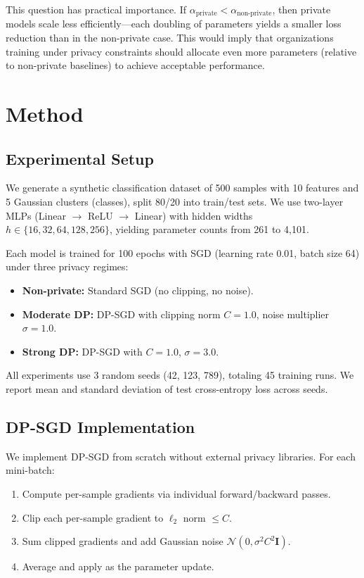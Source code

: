 \documentclass[11pt,a4paper]{article}
\begin{document}
This question has practical importance. If $\alpha_{\text{private}} < \alpha_{\text{non-private}}$, then private models scale less efficiently---each doubling of parameters yields a smaller loss reduction than in the non-private case. This would imply that organizations training under privacy constraints should allocate even more parameters (relative to non-private baselines) to achieve acceptable performance.

\section{Method}

\subsection{Experimental Setup}

We generate a synthetic classification dataset of 500 samples with 10 features and 5 Gaussian clusters (classes), split 80/20 into train/test sets. We use two-layer MLPs (Linear $\to$ ReLU $\to$ Linear) with hidden widths $h \in \{16, 32, 64, 128, 256\}$, yielding parameter counts from 261 to 4,101.

Each model is trained for 100 epochs with SGD (learning rate 0.01, batch size 64) under three privacy regimes:
\begin{itemize}
  \item \textbf{Non-private:} Standard SGD (no clipping, no noise).
  \item \textbf{Moderate DP:} DP-SGD with clipping norm $C = 1.0$, noise multiplier $\sigma = 1.0$.
  \item \textbf{Strong DP:} DP-SGD with $C = 1.0$, $\sigma = 3.0$.
\end{itemize}

All experiments use 3 random seeds (42, 123, 789), totaling 45 training runs. We report mean and standard deviation of test cross-entropy loss across seeds.

\subsection{DP-SGD Implementation}

We implement DP-SGD from scratch without external privacy libraries. For each mini-batch:
\begin{enumerate}
  \item Compute per-sample gradients via individual forward/backward passes.
  \item Clip each per-sample gradient to $\ell_2$ norm $\leq C$.
  \item Sum clipped gradients and add Gaussian noise $\mathcal{N}(0, \sigma^2 C^2 \mathbf{I})$.
  \item Average and apply as the parameter update.
\end{enumerate}
\end{document}
